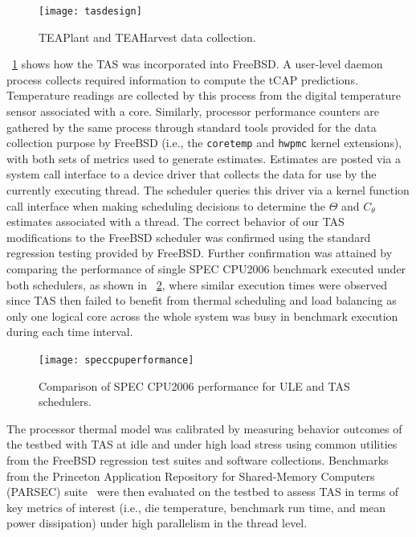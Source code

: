 \documentclass[times, 10pt,twocolumn]{IEEEtran}
\begin{document}
\begin{figure}[!t]
  \centering
  \texttt{[image: tasdesign]}
  \caption{TEAPlant and TEAHarvest data collection.}
  \label{fig:teaplant}
\end{figure}
\figurename~\ref{fig:teaplant} shows how the TAS was incorporated into
FreeBSD. A user-level daemon process collects required information to
compute the tCAP predictions. Temperature readings are collected by this
process from the digital temperature sensor associated with a core.
Similarly, processor performance counters are gathered by the same
process through standard tools provided for the data collection purpose
by FreeBSD (i.e., the \texttt{coretemp} and \texttt{hwpmc} kernel
extensions), with both sets of metrics used to generate estimates.
Estimates are posted via a system call interface to a device driver that
collects the data for use by the currently executing thread.  The
scheduler queries this driver via a kernel function call interface when
making scheduling decisions to determine the $\Theta$ and $C_{\theta}$
estimates associated with a thread.  The correct behavior of our TAS
modifications to the FreeBSD scheduler was confirmed using the standard regression testing provided by FreeBSD.
Further confirmation was attained by comparing the performance of
single SPEC CPU2006 benchmark executed under both schedulers,
as shown in \figurename~\ref{fig:speccpuperf},
where similar execution times were observed since TAS then
failed to benefit from thermal scheduling and load balancing
as only one logical core across the whole system was busy in
benchmark execution during each time interval.

\begin{figure}[!t]
  \centering
  \texttt{[image: speccpuperformance]}
  \caption{Comparison of SPEC CPU2006 performance for ULE and TAS schedulers.}
  \label{fig:speccpuperf}
\end{figure}
The processor thermal model was calibrated by measuring behavior
outcomes of the testbed with TAS at idle and under high load stress
using common utilities from the FreeBSD regression test suites and
software collections.  Benchmarks from the Princeton Application
Repository for Shared-Memory Computers (PARSEC) suite~\cite{Bienia2011}
were then evaluated on the testbed to assess TAS in terms of key metrics
of interest (i.e., die temperature, benchmark run time, and mean power
dissipation) under high parallelism in the thread level.
\end{document}
